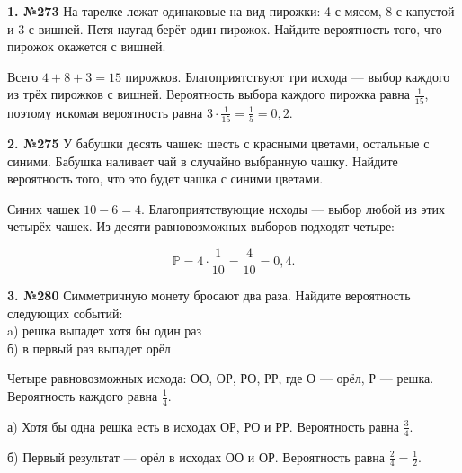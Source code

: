 \begin{task}\label{task-problems-1}
\textbf{1. №273} На тарелке лежат одинаковые на вид пирожки: 4 с мясом, 8 с капустой и 3 с вишней. Петя наугад берёт один пирожок. Найдите вероятность того, что пирожок окажется с вишней.
\end{task}

\begin{solution}\label{solution-addition-of-probabilities-problems-1}
Всего $4+8+3=15$ пирожков. Благоприятствуют три исхода — выбор каждого из трёх пирожков с вишней. Вероятность выбора каждого пирожка равна $\frac1{15}$, поэтому искомая вероятность равна $3\cdot\frac1{15}=\frac15=0,2$.
\end{solution}

\begin{task}\label{task-problems-2}
\textbf{2. №275} У бабушки десять чашек: шесть с красными цветами, остальные с синими. Бабушка наливает чай в случайно выбранную чашку. Найдите вероятность того, что это будет чашка с синими цветами.
\end{task}

\begin{solution}\label{solution-addition-of-probabilities-problems-2}
Синих чашек $10-6=4$. Благоприятствующие исходы — выбор любой из этих четырёх чашек. Из десяти равновозможных выборов подходят четыре:

\[\mathbb P=4\cdot\frac1{10}=\frac4{10}=0,4.\]
\end{solution}

\begin{task}\label{task-problems-3}
\textbf{3. №280} Симметричную монету бросают два раза. Найдите вероятность следующих событий:\\
 a) решка выпадет хотя бы один раз\\
 б) в первый раз выпадет орёл
\end{task}

\begin{solution}\label{solution-addition-of-probabilities-problems-3}
Четыре равновозможных исхода: ОО, ОР, РО, РР, где О — орёл, Р — решка. Вероятность каждого равна $\frac14$.

а) Хотя бы одна решка есть в исходах ОР, РО и РР. Вероятность равна $\frac34$.

б) Первый результат — орёл в исходах ОО и ОР. Вероятность равна $\frac24=\frac12$.
\end{solution}

